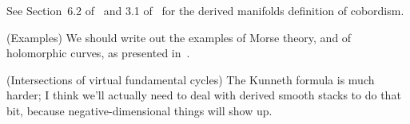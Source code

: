 					See Section~6.2 of~\cite{spivak-thesis} and 3.1 of~\cite{spivak} for the derived manifolds definition of cobordism.
			\enumd
	\item (Examples)
		We should write out the examples of Morse theory, and of holomorphic curves, as presented in~\cite{pardon}.
	\item (Intersections of virtual fundamental cycles)
		The Kunneth formula is much harder; I think we'll actually need to deal with derived smooth stacks to do that bit, because negative-dimensional things will show up.
		
\enumd



